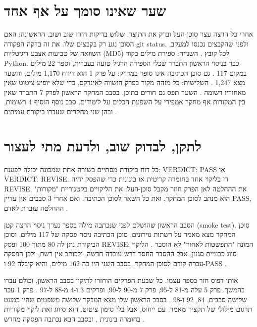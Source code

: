 \section{שער שאינו סומך על אף אחד}
אחרי כל הרצה עצר סוכן-העל ובדק את התוצר. שלוש בדיקות חזרו שוב ושוב. הראשונה: האם הסוכן נגע רק בקבצים שלו. את זה בדקה הפקודה git status, ולפני שהקבצים נכנסו למעקב, השוואה של טביעות אצבע דיגיטליות (MD5) לכל קובץ . השנייה: ספירת מילים בקוד Python. כבר בניסוי הראשון התברר שכלי הספירה הרגיל טועה בעברית, וספר 22 מילים במקום 117 . גם סוכן הכתיבה אינו סופר במדויק: על פרק 1 הוא דיווח 1,170 מילים, והשער מצא 1,247 . השלישית: כל מזהה מקור בפרק הושווה לאינדקס, כדי שלא יופיע ציטוט שאין מאחוריו רשומה .
השער תפס גם חורים בתוכן. בסבב המחקר הראשון לפרק 7 התברר שאין בין המקורות אף מחקר אמפירי על השפעת הכלים על לימודים. סבב נוסף הוסיף 4 רשומות, ובהן שני מחקרים שעברו ביקורת עמיתים .
\section{לתקן, לבדוק שוב, ולדעת מתי לעצור}
כל דוח ביקורת מסתיים בשורה אחת שמכונה יכולה לפענח: VERDICT: PASS או VERDICT: REVISE. די בליקוי אחד בחומרה קריטית או בינונית כדי שהפסק יהיה REVISE. את ההחלטה לאן הפרק חוזר מקבל סוכן-העל: את הליקויים בקטגוריית "מקורות" הוא מנתב לסוכן המחקר, ואת כל השאר לסוכן הכתיבה. ואם אחרי 3 סבבים אין עדיין PASS, ההחלטה עוברת לאדם .
\begin{behindbox}{הסבב הראשון שהושלם}
לפני שנכתבה מילה בספר נערך ניסוי הרצה קטן (smoke test). סוכן המחקר מצא מאמר על רשתות נוירונים, סוכן הכתיבה ניסח פסקה של 117 מילים, וסוכן הביקורת נתן לה 80 מתוך 100 ופסק REVISE: המונח "התפשטות לאחור" לא הוסבר . הליקוי סווג כבעיית סגנון, אבל ההסבר החסר דרש עובדה חדשה, ולכותב אין רשת, ולכן הפסקה עברה קודם לסוכן המחקר. בסבב השני היו בה 162 מילים, והיא קיבלה 92 ו-PASS .
\end{behindbox}
אותו דפוס חזר בספר עצמו. כל שבעת הפרקים הוחזרו לתיקון בסבב הראשון, וכולם עברו בהמשך. פרק 5 עלה מ-81 ל-95, פרק 7 מ-90 ל-99, ופרקים 3 ו-4 מ-88 ל-97 . פרק 1 עבר שלושה סבבים, 84, 92 ו-98 . בסבב הראשון שלו מצא המבקר שלושה משפטים שהיו כמעט תרגום מילולי של תקציר מאמר: עם ייחוס, אבל בלי סימון ציטוט. הוא סיווג זאת ליקוי מקוריות בחומרה בינונית , ובסבב הבא נכתבה הפסקה מחדש .
